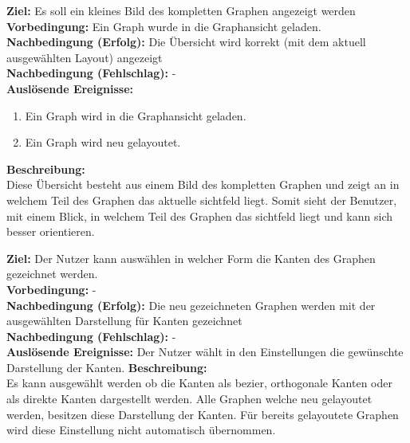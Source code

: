 \label{fa:uebersicht}
\textbf{Ziel:} Es soll ein kleines Bild des kompletten Graphen angezeigt werden \\
\textbf{Vorbedingung:} Ein Graph wurde in die Graphansicht geladen.\\
\textbf{Nachbedingung (Erfolg):} Die Übersicht wird korrekt (mit dem aktuell ausgewählten Layout) angezeigt \\
\textbf{Nachbedingung (Fehlschlag):} -\\
\textbf{Auslösende Ereignisse:}
\begin{enumerate}[nolistsep, label=(\alph*)]
  \item Ein Graph wird in die Graphansicht geladen.
  \item Ein Graph wird neu gelayoutet.
\end{enumerate}
\textbf{Beschreibung:}\\
Diese Übersicht besteht aus einem Bild des kompletten Graphen und zeigt an in welchem Teil des Graphen das aktuelle \gls{sichtfeld} liegt. Somit sieht der Benutzer, mit einem Blick, in welchem Teil des Graphen das \gls{sichtfeld} liegt und kann sich besser orientieren.

\label{fa:darst-kanten}
\textbf{Ziel:} Der Nutzer kann auswählen in welcher Form die Kanten des Graphen gezeichnet werden. \\
\textbf{Vorbedingung:} -\\
\textbf{Nachbedingung (Erfolg):} Die neu gezeichneten Graphen werden mit der ausgewählten Darstellung für Kanten gezeichnet \\
\textbf{Nachbedingung (Fehlschlag):} -\\
\textbf{Auslösende Ereignisse:} Der Nutzer wählt in den Einstellungen die gewünschte Darstellung der Kanten.
\textbf{Beschreibung:}\\
Es kann ausgewählt werden ob die Kanten als \gls{bezier}, orthogonale Kanten oder als direkte Kanten dargestellt werden. Alle Graphen welche neu gelayoutet werden, besitzen diese Darstellung der Kanten. Für bereits gelayoutete Graphen wird diese Einstellung nicht automatisch übernommen.

